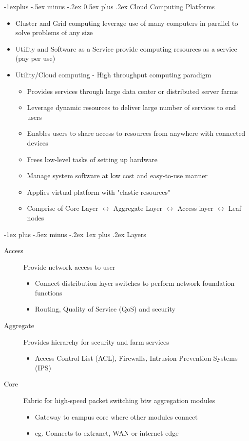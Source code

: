 \documentclass{article}
\makeatletter
\renewcommand{\subsection}{\@startsection{subsection}{2}{0mm}%
    {-1explus -.5ex minus -.2ex}%
    {0.5ex plus .2ex}%
{\normalfont\normalsize\bfseries}}
\renewcommand{\subsubsection}{\@startsection{subsubsection}{3}{0mm}%
    {-1ex plus -.5ex minus -.2ex}%
    {1ex plus .2ex}%
{\normalfont\small\bfseries}}%
\makeatother
\begin{document}
\begin{multicols*}{3}
\subsection{Cloud Computing Platforms}
\begin{itemize}
	\item Cluster and Grid computing leverage use of many computers in parallel to solve problems of any size
	\item Utility and Software as a Service provide computing resources as a service (pay per use)
	\item Utility/Cloud computing - High throughput computing paradigm 
	\begin{itemize}
		\item Provides services through large data center or distributed server farms
		\item Leverage dynamic resources to deliver large number of services to end users
		\item Enables users to share access to resources from anywhere with connected devices
		\item Frees low-level tasks of setting up hardware 
		\item Manage system software at low cost and easy-to-use manner
		\item Applies virtual platform with "elastic resources"
		\item Comprise of Core Layer $\leftrightarrow$ Aggregate Layer $\leftrightarrow$ Access layer $\leftrightarrow$ Leaf nodes
	\end{itemize}
\end{itemize}
\subsubsection{Layers}
\begin{description}
	\item[Access]{Provide network access to user}
	\begin{itemize}
		\item Connect distribution layer switches to perform network foundation functions
		\item Routing, Quality of Service (QoS) and security
	\end{itemize}
	\item[Aggregate]{Provides hierarchy for security and farm services}
	\begin{itemize}
		\item Access Control List (ACL), Firewalls, Intrusion Prevention Systems (IPS)
	\end{itemize}
	\item[Core]{Fabric for high-speed packet switching btw aggregation modules}
	\begin{itemize}
		\item Gateway to campus core where other modules connect
		\item eg. Connects to extranet, WAN or internet edge
	\end{itemize}
\end{description}

\end{multicols*}
\end{document}
